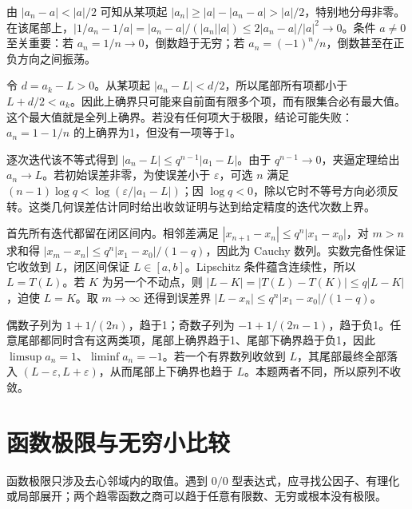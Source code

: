 \documentclass[UTF8,12pt,a4paper,fontset=fandol]{ctexart}
\begin{document}
\begin{solve}\label{ans:c2q16}
由 $|a_n-a|<|a|/2$ 可知从某项起 $|a_n|\ge|a|-|a_n-a|>|a|/2$，特别地分母非零。在该尾部上，$|1/a_n-1/a|=|a_n-a|/(|a_n||a|)\le2|a_n-a|/|a|^2\to0$。条件 $a\ne0$ 至关重要：若 $a_n=1/n\to0$，倒数趋于无穷；若 $a_n=(-1)^n/n$，倒数甚至在正负方向之间振荡。
\end{solve}

\begin{solve}\label{ans:c2q17}
令 $d=a_k-L>0$。从某项起 $|a_n-L|<d/2$，所以尾部所有项都小于 $L+d/2<a_k$。因此上确界只可能来自前面有限多个项，而有限集合必有最大值。这个最大值就是全列上确界。若没有任何项大于极限，结论可能失败：$a_n=1-1/n$ 的上确界为1，但没有一项等于1。
\end{solve}

\begin{solve}\label{ans:c2q18}
逐次迭代该不等式得到 $|a_n-L|\le q^{n-1}|a_1-L|$。由于 $q^{n-1}\to0$，夹逼定理给出 $a_n\to L$。若初始误差非零，为使误差小于 $\varepsilon$，可选 $n$ 满足 $(n-1)\log q<\log(\varepsilon/|a_1-L|)$；因 $\log q<0$，除以它时不等号方向必须反转。这类几何误差估计同时给出收敛证明与达到给定精度的迭代次数上界。
\end{solve}

\begin{solve}\label{ans:c2q19}
首先所有迭代都留在闭区间内。相邻差满足 $|x_{n+1}-x_n|\le q^n|x_1-x_0|$，对 $m>n$ 求和得 $|x_m-x_n|\le q^n|x_1-x_0|/(1-q)$，因此为 Cauchy 数列。实数完备性保证它收敛到 $L$，闭区间保证 $L\in[a,b]$。Lipschitz 条件蕴含连续性，所以 $L=T(L)$。若 $K$ 为另一个不动点，则 $|L-K|=|T(L)-T(K)|\le q|L-K|$，迫使 $L=K$。取 $m\to\infty$ 还得到误差界 $|L-x_n|\le q^n|x_1-x_0|/(1-q)$。
\end{solve}

\begin{solve}\label{ans:c2q20}
偶数子列为 $1+1/(2n)$，趋于1；奇数子列为 $-1+1/(2n-1)$，趋于负1。任意尾部都同时含有这两类项，尾部上确界趋于1、尾部下确界趋于负1，因此 $\limsup a_n=1$、$\liminf a_n=-1$。若一个有界数列收敛到 $L$，其尾部最终全部落入 $(L-\varepsilon,L+\varepsilon)$，从而尾部上下确界也趋于 $L$。本题两者不同，所以原列不收敛。
\end{solve}

\clearpage
\section{函数极限与无穷小比较}\label{sec:ch3}
函数极限只涉及去心邻域内的取值。遇到 $0/0$ 型表达式，应寻找公因子、有理化或局部展开；两个趋零函数之商可以趋于任意有限数、无穷或根本没有极限。
\end{document}

